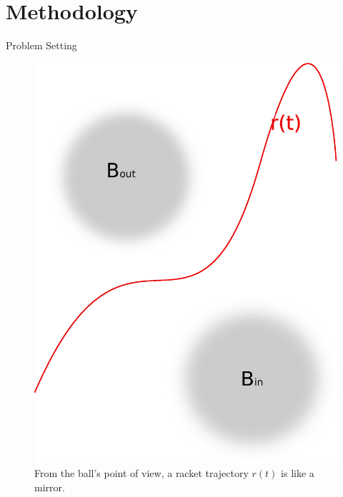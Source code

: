 \documentclass[handout]{beamer}
\begin{document}
\section{Methodology}
%
\begin{frame}{Problem Setting}
\begin{figure}[t!]
\centering
\includegraphics[scale=0.3]{drawingBallsEye.eps}			
\caption{From the ball's point of view, a racket trajectory $r(t)$ is like a mirror.}
\label{mainIdea2}
\end{figure}
\end{frame}
%
\end{document}
